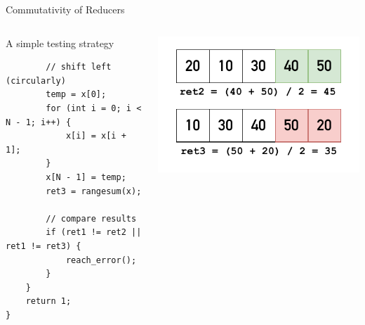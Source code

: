 \documentclass[aspectratio=1610,10.5pt]{beamer} %
\begin{document}
\begin{frame}[fragile]{Commutativity of Reducers}
    \begin{columns}
        \begin{column}{0.48\textwidth}
            \begin{block}{A simple testing strategy}
                    \begin{verbatim}
        // shift left (circularly)
        temp = x[0];
        for (int i = 0; i < N - 1; i++) {
            x[i] = x[i + 1];
        }
        x[N - 1] = temp;
        ret3 = rangesum(x);

        // compare results
        if (ret1 != ret2 || ret1 != ret3) {
            reach_error();
        }
    }
    return 1;
}
                    \end{verbatim}
            \end{block}
        \end{column}
        \begin{column}{0.55\textwidth}
            \includegraphics[height=%
            0.55\textheight]{../res/rangesum-ret3}
        \end{column}
    \end{columns}
\end{frame}
\end{document}
